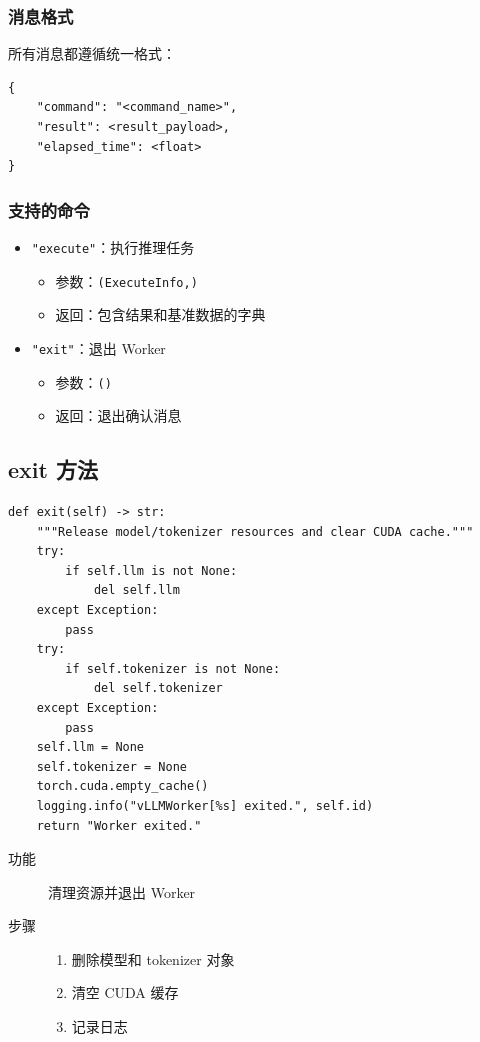 \documentclass[12pt,a4paper]{article}
\begin{document}
\subsubsection{消息格式}

所有消息都遵循统一格式：

\begin{lstlisting}
{
    "command": "<command_name>",
    "result": <result_payload>,
    "elapsed_time": <float>
}
\end{lstlisting}

\subsubsection{支持的命令}

\begin{itemize}
    \item \texttt{"execute"}：执行推理任务
    \begin{itemize}
        \item 参数：\texttt{(ExecuteInfo,)}
        \item 返回：包含结果和基准数据的字典
    \end{itemize}
    
    \item \texttt{"exit"}：退出 Worker
    \begin{itemize}
        \item 参数：\texttt{()}
        \item 返回：退出确认消息
    \end{itemize}
\end{itemize}

\subsection{exit 方法}

\begin{lstlisting}
def exit(self) -> str:
    """Release model/tokenizer resources and clear CUDA cache."""
    try:
        if self.llm is not None:
            del self.llm
    except Exception:
        pass
    try:
        if self.tokenizer is not None:
            del self.tokenizer
    except Exception:
        pass
    self.llm = None
    self.tokenizer = None
    torch.cuda.empty_cache()
    logging.info("vLLMWorker[%s] exited.", self.id)
    return "Worker exited."
\end{lstlisting}

\begin{description}
    \item[功能] 清理资源并退出 Worker
    \item[步骤]
    \begin{enumerate}
        \item 删除模型和 tokenizer 对象
        \item 清空 CUDA 缓存
        \item 记录日志
    \end{enumerate}
\end{description}
\end{document}
